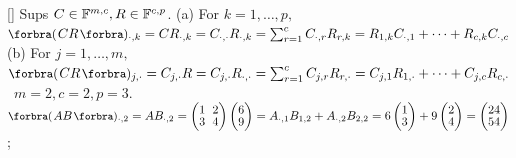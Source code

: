 [\Sbra]{
	Sups $C\in{\mathbb{F}}^{m,c},R\in{\mathbb{F}}^{c,p}$. \hfill{}\TextB{\vspace{2pt}}
	(a) For $k=1,\dots,p,$\quad $\BigPar{CR}{_{\cdot,k}}=CR_{\cdot,k}=C_{\cdot,\cdot}R_{\cdot,k}=\sum_{r=1}^c C_{\cdot,r}R_{r,k}=R_{1,k}C_{\cdot,1}+\dots+R_{c,k}C_{\cdot,c}$\TextB{\vspace{3pt}}
	(b) For $j=1,\dots,m,$\quad $\BigPar{CR}{_{j,\cdot}}=C_{j,\cdot}R=C_{j,\cdot}R_{\cdot,\cdot}=\sum_{r=1}^c C_{j,r}R_{r,\cdot}=C_{j,1}R_{1,\cdot}+\dots+C_{j,c}R_{c,\cdot}$\TextB{\vspace{2pt}}
}\BulletPointX\Example \,\,\,$m=2,c=2,p=3.$\TextB{\vspace{2pt}}
$\BigPar{AB}{_{\cdot,2}}=AB_{\cdot, 2}=\begin{pmatrix} 1 &\hspace{-4pt} 2\\[-2pt] 3 &\hspace{-4pt} 4\end{pmatrix}\begin{pmatrix} 6 \\[-2pt] 9\end{pmatrix}=A_{\cdot,1}B_{1,2}+A_{\cdot,2}B_{2,2}=6\begin{pmatrix}1\\[-2pt]3\end{pmatrix}+9\begin{pmatrix}2\\[-2pt]4\end{pmatrix}=\begin{pmatrix} 24\\[-2pt] 54\end{pmatrix}$;\TextB{\vspace{2pt}}
